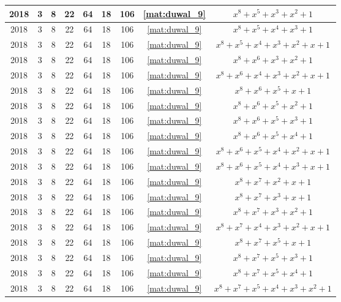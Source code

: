 \begin{longtable}{|c|c|c|c|c|c|c|c|c|}
2018 & 3 & 8 & 22 & 64 & 18 & 106 & \eqref{mat:duwal_9} & $x^8 + x^5 + x^3 + x^2 + 1$ \\ \hline 
2018 & 3 & 8 & 22 & 64 & 18 & 106 & \eqref{mat:duwal_9} & $x^8 + x^5 + x^4 + x^3 + 1$ \\ \hline 
2018 & 3 & 8 & 22 & 64 & 18 & 106 & \eqref{mat:duwal_9} & $x^8 + x^5 + x^4 + x^3 + x^2 + x + 1$ \\ \hline 
2018 & 3 & 8 & 22 & 64 & 18 & 106 & \eqref{mat:duwal_9} & $x^8 + x^6 + x^3 + x^2 + 1$ \\ \hline 
2018 & 3 & 8 & 22 & 64 & 18 & 106 & \eqref{mat:duwal_9} & $x^8 + x^6 + x^4 + x^3 + x^2 + x + 1$ \\ \hline 
2018 & 3 & 8 & 22 & 64 & 18 & 106 & \eqref{mat:duwal_9} & $x^8 + x^6 + x^5 + x + 1$ \\ \hline 
2018 & 3 & 8 & 22 & 64 & 18 & 106 & \eqref{mat:duwal_9} & $x^8 + x^6 + x^5 + x^2 + 1$ \\ \hline 
2018 & 3 & 8 & 22 & 64 & 18 & 106 & \eqref{mat:duwal_9} & $x^8 + x^6 + x^5 + x^3 + 1$ \\ \hline 
2018 & 3 & 8 & 22 & 64 & 18 & 106 & \eqref{mat:duwal_9} & $x^8 + x^6 + x^5 + x^4 + 1$ \\ \hline 
2018 & 3 & 8 & 22 & 64 & 18 & 106 & \eqref{mat:duwal_9} & $x^8 + x^6 + x^5 + x^4 + x^2 + x + 1$ \\ \hline 
2018 & 3 & 8 & 22 & 64 & 18 & 106 & \eqref{mat:duwal_9} & $x^8 + x^6 + x^5 + x^4 + x^3 + x + 1$ \\ \hline 
2018 & 3 & 8 & 22 & 64 & 18 & 106 & \eqref{mat:duwal_9} & $x^8 + x^7 + x^2 + x + 1$ \\ \hline 
2018 & 3 & 8 & 22 & 64 & 18 & 106 & \eqref{mat:duwal_9} & $x^8 + x^7 + x^3 + x + 1$ \\ \hline 
2018 & 3 & 8 & 22 & 64 & 18 & 106 & \eqref{mat:duwal_9} & $x^8 + x^7 + x^3 + x^2 + 1$ \\ \hline 
2018 & 3 & 8 & 22 & 64 & 18 & 106 & \eqref{mat:duwal_9} & $x^8 + x^7 + x^4 + x^3 + x^2 + x + 1$ \\ \hline 
2018 & 3 & 8 & 22 & 64 & 18 & 106 & \eqref{mat:duwal_9} & $x^8 + x^7 + x^5 + x + 1$ \\ \hline 
2018 & 3 & 8 & 22 & 64 & 18 & 106 & \eqref{mat:duwal_9} & $x^8 + x^7 + x^5 + x^3 + 1$ \\ \hline 
2018 & 3 & 8 & 22 & 64 & 18 & 106 & \eqref{mat:duwal_9} & $x^8 + x^7 + x^5 + x^4 + 1$ \\ \hline 
2018 & 3 & 8 & 22 & 64 & 18 & 106 & \eqref{mat:duwal_9} & $x^8 + x^7 + x^5 + x^4 + x^3 + x^2 + 1$ \\ \hline 

\end{longtable}
